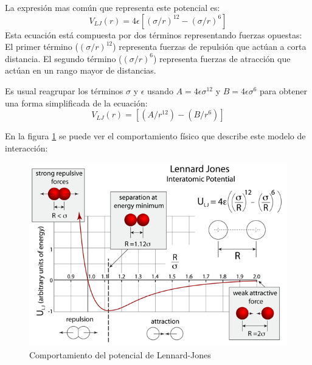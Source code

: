 La expresión mas común que representa este potencial es: 
\begingroup
\fontsize{14pt}{5pt}
\begin{equation}\label{lennardEquation} V_{LJ}(r)= 4 \epsilon [ (\sigma/r)^{12} - (\sigma/r)^6] \end{equation}
\endgroup
Esta ecuación está compuesta por dos términos representando fuerzas opuestas:
El primer término ($(\sigma/r)^{12}$) representa fuerzas de repulsión que actúan a corta distancia.
El segundo término ($(\sigma/r)^{6}$) representa fuerzas de atracción que actúan en un rango mayor de distancias.

Es usual reagrupar los términos $\sigma$ y  $\epsilon$ usando  
$A=4\epsilon\sigma^{12}  $  y  $B=4\epsilon\sigma^6$ para obtener una forma simplificada de la ecuación:   \begin{equation}  V_{LJ}(r)= [ (A/r^{12}) - (B/r^6)] \end{equation}



En la figura \ref{lennardimage} se puede ver el comportamiento físico que describe este modelo de interacción:



\begin{figure}[!ht]
\centering
\includegraphics[height=8cm,keepaspectratio, width=\textwidth]{img/md/LennardJonesFull.png}
\caption{Comportamiento del potencial de Lennard-Jones}
\label{lennardimage}
\end{figure}

